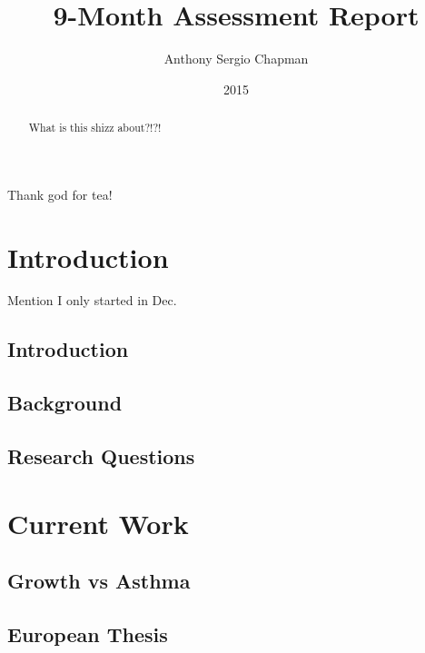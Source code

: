 \documentclass[bsc]{abdnthesis}
\author{Anthony Sergio Chapman}
\title{9-Month Assessment Report}
\date{2015}
\begin{document}
\maketitle
\makedeclaration


\begin{abstract}
  What is this shizz about?!?!
\end{abstract}

\begin{acknowledgements}
  Thank god for tea!
\end{acknowledgements}

\tableofcontents


\chapter{Introduction}

Mention I only started in Dec. 

\section{Introduction} %
\label{sec:introduction}

\section{Background} %
\label{sec:background}

\section{Research Questions} %
\label{sec:research_questions}



\chapter{Current Work}
\section{Growth vs Asthma} %
\label{sec:growth_vs_asthma}

\section{European Thesis} %
\label{sec:european_thesis}
\end{document}
